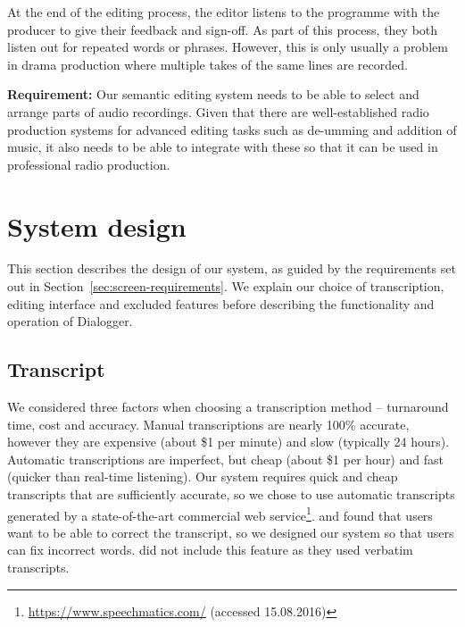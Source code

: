 At the end of the editing process, the editor listens to the programme with the
producer to give their feedback and sign-off. As part of this process, they both listen out for repeated words or
phrases. However, this is only usually a problem in drama production where multiple takes of the same lines are
recorded.

\textbf{Requirement:} Our semantic editing system needs to be able to select and arrange parts of audio recordings.
Given that there are well-established radio production systems for advanced editing tasks such as de-umming and
addition of music, it also needs to be able to integrate with these so that it can be used in professional radio
production.


%
%
%
%
%
%

\section{System design}\label{sec:screen-design}
This section describes the design of our system, as guided by the requirements set out in
Section~\ref{sec:screen-requirements}. We explain our choice of transcription, editing interface and excluded features
before describing the functionality and operation of Dialogger.

\subsection{Transcript}
We considered three factors when choosing a transcription method -- turnaround time, cost and accuracy. Manual
transcriptions are nearly 100\% accurate, however they are expensive (about \$1 per minute) and slow (typically 24
hours). Automatic transcriptions are imperfect, but cheap (about \$1 per hour) and fast (quicker than real-time
listening). Our system requires quick and cheap transcripts that are sufficiently accurate, so we chose to use automatic
transcripts generated by a state-of-the-art commercial web service\footnote{\url{https://www.speechmatics.com/}
  (accessed 15.08.2016)}.
\citet{Whittaker2004} and \citet{Sivaraman2016} found that users want to be able to correct the transcript, so we
designed our system so that users can fix incorrect words.
\citet{Rubin2013} did not include this feature as they used verbatim transcripts.

